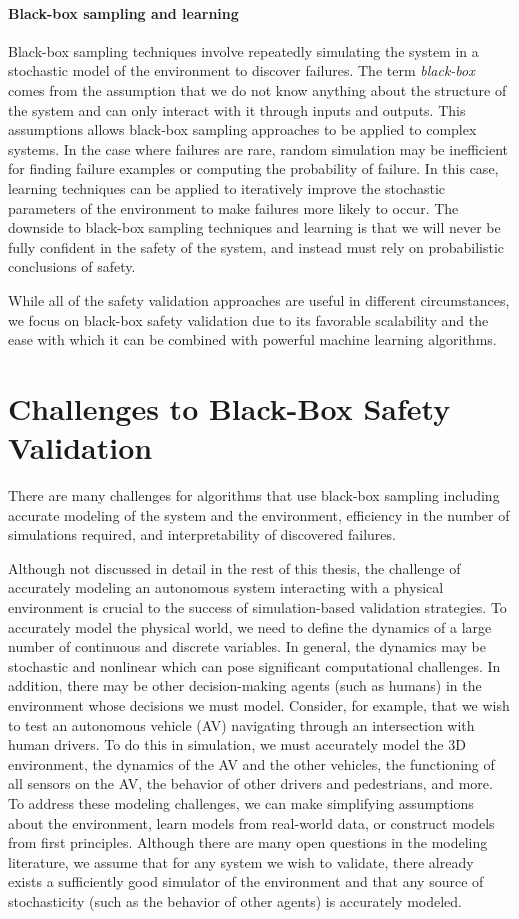 \paragraph{Black-box sampling and learning} Black-box sampling techniques involve repeatedly simulating the system in a stochastic model of the environment to discover failures. The term \emph{black-box} comes from the assumption that we do not know anything about the structure of the system and can only interact with it through inputs and outputs. This assumptions allows black-box sampling approaches to be applied to complex systems. In the case where failures are rare, random simulation may be inefficient for finding failure examples or computing the probability of failure. In this case, learning techniques can be applied to iteratively improve the stochastic parameters of the environment to make failures more likely to occur. The downside to black-box sampling techniques and learning is that we will never be fully confident in the safety of the system, and instead must rely on probabilistic conclusions of safety. 

While all of the safety validation approaches are useful in different circumstances, we focus on black-box safety validation due to its favorable scalability and the ease with which it can be combined with powerful machine learning algorithms.


\section{Challenges to Black-Box Safety Validation}
There are many challenges for algorithms that use black-box sampling including accurate modeling of the system and the environment, efficiency in the number of simulations required, and interpretability of discovered failures. 

Although not discussed in detail in the rest of this thesis, the challenge of accurately modeling an autonomous system interacting with a physical environment is crucial to the success of simulation-based validation strategies. To accurately model the physical world, we need to define the dynamics of a large number of continuous and discrete variables. In general, the dynamics may be stochastic and nonlinear which can pose significant computational challenges. In addition, there may be other decision-making agents (such as humans) in the environment whose decisions we must model. Consider, for example, that we wish to test an autonomous vehicle (AV) navigating through an intersection with human drivers. To do this in simulation, we must accurately model the 3D environment, the dynamics of the AV and the other vehicles, the functioning of all sensors on the AV, the behavior of other drivers and pedestrians, and more. To address these modeling challenges, we can make simplifying assumptions about the environment, learn models from real-world data, or construct models from first principles. Although there are many open questions in the modeling literature, we assume that for any system we wish to validate, there already exists a sufficiently good simulator of the environment and that any source of stochasticity (such as the behavior of other agents) is accurately modeled. 

